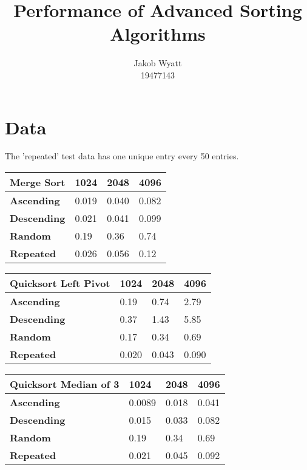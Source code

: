 \documentclass{article}
\author{Jakob Wyatt\\19477143}
\title{Performance of Advanced Sorting Algorithms}
\begin{document}
\maketitle
\section{Data}

The 'repeated' test data has one unique entry every 50 entries.

\begin{table}[H]
\centering
\begin{tabularx}{\linewidth}{| X | X | X | X |}
\hline
\textbf{Merge Sort} & \textbf{1024} & \textbf{2048} & \textbf{4096} \\
\hline
\textbf{Ascending} & 0.019 & 0.040 & 0.082 \\
\hline
\textbf{Descending} & 0.021 & 0.041 & 0.099 \\
\hline
\textbf{Random}  & 0.19 & 0.36 & 0.74 \\
\hline
\textbf{Repeated} & 0.026 & 0.056 & 0.12 \\
\hline
\end{tabularx}
\end{table}

\begin{table}[H]
\centering
\begin{tabularx}{\linewidth}{| X | X | X | X |}
\hline
\textbf{Quicksort Left Pivot} & \textbf{1024} & \textbf{2048} & \textbf{4096} \\
\hline
\textbf{Ascending} & 0.19 & 0.74 & 2.79 \\
\hline
\textbf{Descending} & 0.37 & 1.43 & 5.85 \\
\hline
\textbf{Random}  & 0.17 & 0.34 & 0.69 \\
\hline
\textbf{Repeated} & 0.020 & 0.043 & 0.090 \\
\hline
\end{tabularx}
\end{table}

\begin{table}[H]
\centering
\begin{tabularx}{\linewidth}{| X | X | X | X |}
\hline
\textbf{Quicksort Median of 3} & \textbf{1024} & \textbf{2048} & \textbf{4096} \\
\hline
\textbf{Ascending} & 0.0089 & 0.018 & 0.041 \\
\hline
\textbf{Descending} & 0.015 & 0.033 & 0.082 \\
\hline
\textbf{Random}  & 0.19 & 0.34 & 0.69 \\
\hline
\textbf{Repeated} & 0.021 & 0.045 & 0.092 \\
\hline
\end{tabularx}
\end{table}
\end{document}
